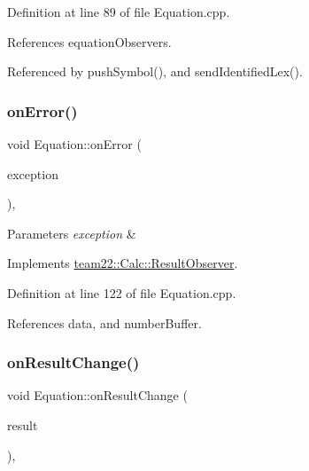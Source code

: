 Definition at line 89 of file Equation.\+cpp.



References equation\+Observers.



Referenced by push\+Symbol(), and send\+Identified\+Lex().

\mbox{\label{classteam22_1_1_calc_1_1_equation_a4e7a0614867931bcc714440441cdd894}} 
\subsubsection{\texorpdfstring{on\+Error()}{onError()}}
{\footnotesize\ttfamily void Equation\+::on\+Error (\begin{DoxyParamCaption}\item[{\hyperlink{class_interpret_exception}{Interpret\+Exception}}]{exception }\end{DoxyParamCaption})\hspace{0.3cm}{\ttfamily [override]}, {\ttfamily [virtual]}}


\begin{DoxyParams}{Parameters}
{\em exception} & \\
\hline
\end{DoxyParams}


Implements \hyperlink{classteam22_1_1_calc_1_1_result_observer_ad36cf8df89853d60f91094800c01d329}{team22\+::\+Calc\+::\+Result\+Observer}.



Definition at line 122 of file Equation.\+cpp.



References data, and number\+Buffer.

\mbox{\label{classteam22_1_1_calc_1_1_equation_a302c295e099f589897a1bad4b02d3de8}} 
\subsubsection{\texorpdfstring{on\+Result\+Change()}{onResultChange()}}
{\footnotesize\ttfamily void Equation\+::on\+Result\+Change (\begin{DoxyParamCaption}\item[{Math\+::\+Number}]{result }\end{DoxyParamCaption})\hspace{0.3cm}{\ttfamily [override]}, {\ttfamily [virtual]}}


